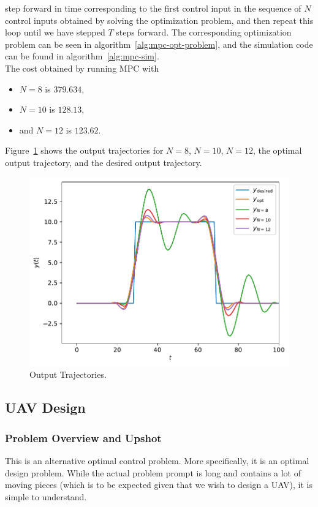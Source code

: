 \documentclass[12pt,reqno]{article}
\theoremstyle{definition}
\numberwithin{equation}{section}
\begin{document}
    step forward in time corresponding to the first control input in the sequence of $N$ control inputs obtained by solving the optimization problem, 
    and then repeat this loop until we have stepped $T$ steps forward. The corresponding
    optimization problem can be seen in algorithm~\ref{alg:mpc-opt-problem}, and the simulation
    code can be found in algorithm~\ref{alg:mpc-sim}.\\
    \noindent The cost obtained by running MPC with
    \begin{itemize}
        \item $N = 8$ is $379.634$,
        \item $N = 10$ is $128.13$,
        \item and $N=12$ is $123.62$.
    \end{itemize}
    Figure~\ref{fig:364-hw7-traj-out} shows the output trajectories for $N=8$, $N=10$, $N=12$,
    the optimal output trajectory, and the desired output trajectory.

    \begin{figure}[htbp]
        \centering
        \includegraphics[width=\linewidth]{../examples/364b/364b_mpc_output.pdf}
        \caption{Output Trajectories.}
        \label{fig:364-hw7-traj-out}
    \end{figure}

\newpage
\subsection{UAV Design}

\subsubsection*{Problem Overview and Upshot}
This is an alternative optimal control problem. More specifically, it is an optimal design problem.
While the actual problem prompt is long and contains a lot of moving pieces (which is to be expected
given that we wish to design a UAV), it is simple to understand.
\end{document}
